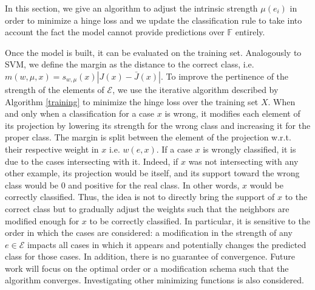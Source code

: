 \documentclass[sigconf,edbt]{acmart-edbt-workshops}
\begin{document}
In this section, we give an algorithm to adjust the intrinsic strength $\mu({e}_i)$ in order to minimize a hinge loss and we update the classification rule to take into account the fact the model cannot provide predictions over $\mathbb F$ entirely.

Once the model is built, it can be evaluated on the training set. Analogously to SVM, we define the margin as the distance to the correct class, i.e. $m(w, \mu, x) = s_{w,\mu}(x)|J(x) - \bar J(x)|$. To improve the pertinence of the strength of the elements of $\mathcal{E}$, we use the iterative algorithm described by Algorithm \ref{training} to minimize the hinge loss over the training set $X$.
When and only when a classification for a case $x$ is wrong, it modifies each element of its projection by lowering its strength for the wrong class and increasing it for the proper class. The margin is split between the element of the projection w.r.t. their respective weight in $x$ i.e. $w(e,x)$. If a case $x$ is wrongly classified, it is due to the cases intersecting with it. Indeed, if $x$ was not intersecting with any other example, its projection would be itself, and its support toward the wrong class would be 0 and positive for the real class. In other words, $x$ would be correctly classified. Thus, the idea is not to directly bring the support of $x$ to the correct class but to gradually adjust the weights such that the neighbors are modified enough for $x$ to be correctly classified. In particular, it is sensitive to the order in which the cases are considered: a modification in the strength of any $e \in \mathcal{E}$ impacts all cases in which it appears and potentially changes the predicted class for those cases. In addition, there is no guarantee of convergence. Future work will focus on the optimal order or a modification schema such that the algorithm converges. Investigating other minimizing functions is also considered.
\algrenewcommand\algorithmicindent{1.0em}%
\end{document}
